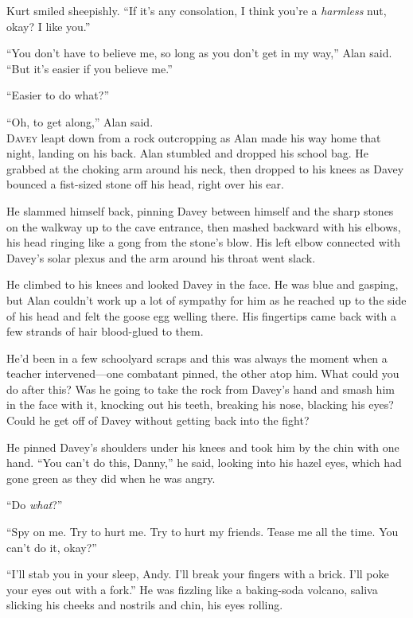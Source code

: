 Kurt smiled sheepishly.  ``If it's any consolation, I think you're a
\textit{harmless} nut, okay?  I like you.''

``You don't have to believe me, so long as you don't get in my way,''
Alan said.  ``But it's easier if you believe me.''

``Easier to do what?''

``Oh, to get along,'' Alan said.
\\
\lettrine[lines=3, lhang=.5, nindent=0pt, findent=2pt]{D}{avey} leapt down from a rock outcropping as Alan made his way home
that night, landing on his back.  Alan stumbled and dropped his school
bag.  He grabbed at the choking arm around his neck, then dropped to
his knees as Davey bounced a fist-sized stone off his head, right over
his ear.

He slammed himself back, pinning Davey between himself and the sharp
stones on the walkway up to the cave entrance, then mashed backward
with his elbows, his head ringing like a gong from the stone's blow. 
His left elbow connected with Davey's solar plexus and the arm around
his throat went slack.

He climbed to his knees and looked Davey in the face.  He was blue and
gasping, but Alan couldn't work up a lot of sympathy for him as he
reached up to the side of his head and felt the goose egg welling
there.  His fingertips came back with a few strands of hair
blood-glued to them.

He'd been in a few schoolyard scraps and this was always the moment
when a teacher intervened---one combatant pinned, the other atop him. 
What could you do after this?  Was he going to take the rock from
Davey's hand and smash him in the face with it, knocking out his
teeth, breaking his nose, blacking his eyes?  Could he get off of
Davey without getting back into the fight?

He pinned Davey's shoulders under his knees and took him by the chin
with one hand.  ``You can't do this, Danny,'' he said, looking into
his hazel eyes, which had gone green as they did when he was angry.

``Do \textit{what}?''

``Spy on me.  Try to hurt me.  Try to hurt my friends.  Tease me all
the time.  You can't do it, okay?''

``I'll stab you in your sleep, Andy.  I'll break your fingers with a
brick.  I'll poke your eyes out with a fork.'' He was fizzling like a
baking-soda volcano, saliva slicking his cheeks and nostrils and chin,
his eyes rolling.


